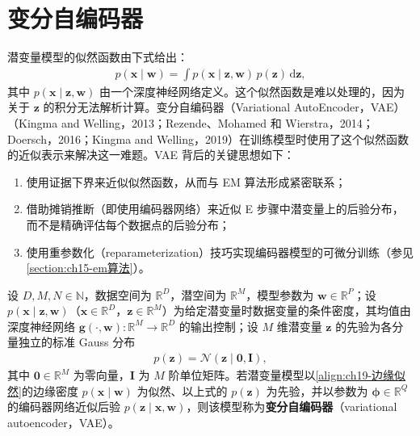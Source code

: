 \documentclass[../../main.tex]{subfiles}
\begin{document}
\section{变分自编码器}\label{section:ch19-变分自编码器}

潜变量模型的似然函数由下式给出：
\begin{align}
p(\bm{x}\mid\bm{w})=\int p(\bm{x}\mid\bm{z},\bm{w})\,p(\bm{z})\,\mathrm{d}\bm{z},
\label{align:ch19-边缘似然}
\end{align}
其中 $p(\bm{x}\mid\bm{z},\bm{w})$ 由一个深度神经网络定义。这个似然函数是难以处理的，因为关于 $\bm{z}$ 的积分无法解析计算。变分自编码器（Variational AutoEncoder，VAE）（Kingma and Welling，2013；Rezende、Mohamed 和 Wierstra，2014；Doersch，2016；Kingma and Welling，2019）在训练模型时使用了这个似然函数的近似表示来解决这一难题。VAE 背后的关键思想如下：
\begin{enumerate}[(1)]
\item 使用证据下界来近似似然函数，从而与 EM 算法形成紧密联系；
\item 借助摊销推断（即使用编码器网络）来近似 E 步骤中潜变量上的后验分布，而不是精确评估每个数据点的后验分布；
\item 使用重参数化（reparameterization）技巧实现编码器模型的可微分训练（参见\cref{section:ch15-em算法}）。
\end{enumerate}

\begin{definition}[变分自编码器]\label{definition:ch19-变分自编码器}
设 $D,M,N\in\mathbb{N}$，数据空间为 $\mathbb{R}^{D}$，潜空间为 $\mathbb{R}^{M}$，模型参数为 $\bm{w}\in\mathbb{R}^{P}$；设 $p(\bm{x}\mid\bm{z},\bm{w})$（$\bm{x}\in\mathbb{R}^{D}$，$\bm{z}\in\mathbb{R}^{M}$）为给定潜变量时数据变量的条件密度，其均值由深度神经网络 $\bm{g}(\cdot,\bm{w}):\mathbb{R}^{M}\to\mathbb{R}^{D}$ 的输出控制；设 $M$ 维潜变量 $\bm{z}$ 的先验为各分量独立的标准 Gauss 分布
\begin{align}
p(\bm{z})=\mathcal{N}(\bm{z}\mid\bm{0},\bm{I}),
\label{align:ch19-先验}
\end{align}
其中 $\bm{0}\in\mathbb{R}^{M}$ 为零向量，$\bm{I}$ 为 $M$ 阶单位矩阵。若潜变量模型以\eqref{align:ch19-边缘似然}的边缘密度 $p(\bm{x}\mid\bm{w})$ 为似然、以上式的 $p(\bm{z})$ 为先验，并以参数为 $\bm{\phi}\in\mathbb{R}^{Q}$ 的编码器网络近似后验 $p(\bm{z}\mid\bm{x},\bm{w})$，则该模型称为\textbf{变分自编码器}（variational autoencoder，VAE）。
\end{definition}
\end{document}
